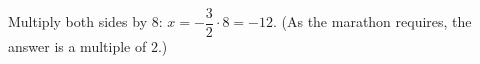 Multiply both sides by $8$: $x=-\dfrac{3}{2}\cdot8=\boxed{-12}$. (As the marathon requires, the answer is a multiple of $2$.)
